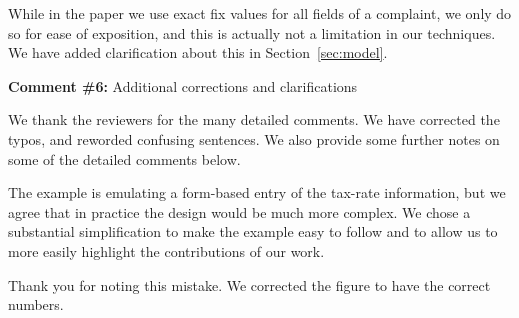 While in the paper we use exact fix values for all fields of a complaint, we
only do so for ease of exposition, and this is actually not a limitation in
our techniques. We have added clarification about this in
Section~\ref{sec:model}.



\comskip

\noindent
\textbf{Comment \#6:} Additional corrections and clarifications

\smallskip

We thank the reviewers for the many detailed comments. We have corrected the
typos, and reworded confusing sentences. We also provide some further notes on
some of the detailed comments below.

\begin{quote}
\end{quote}

The example is emulating a form-based entry of the tax-rate information, but
we agree that in practice the design would be much more complex. We chose a
substantial simplification to make the example easy to follow and to allow us
to more easily highlight the contributions of our work.

\begin{quote}
\end{quote}

Thank you for noting this mistake. We corrected the figure to have the
correct numbers.


\begin{quote}
\end{quote}



\begin{quote}
\end{quote}


